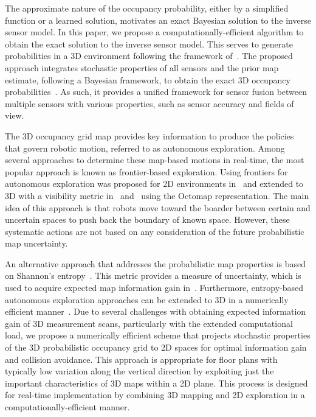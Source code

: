 \documentclass[smallextended]{svjour3}       %
\begin{document}
The approximate nature of the occupancy probability, either by a simplified function or a learned solution, motivates an exact Bayesian solution to the inverse sensor model. In this paper, we propose a computationally-efficient algorithm to obtain the exact solution to the inverse sensor model. This serves to generate probabilities in a 3D environment following the framework of~\cite{KauLeeAiMos16,KauTakAiLee17}. The proposed approach integrates stochastic properties of all sensors and the prior map estimate, following a Bayesian framework, to obtain the exact 3D occupancy probabilities~\cite{KauTakAiLee18}. As such, it provides a unified framework for sensor fusion between multiple sensors with various properties, such as sensor accuracy and fields of view. 


The 3D occupancy grid map provides key information to produce the policies that govern robotic motion, referred to as autonomous exploration. Among several approaches to determine these map-based motions in real-time, the most popular approach is known as frontier-based exploration. Using frontiers for autonomous exploration was proposed for 2D environments in~\cite{Yam97,Yam98} and extended to 3D with a visibility metric in~\cite{SawKriSri09} and~\cite{ZhuDinLinWu15,SenWan16,KleDor13} using the Octomap representation. The main idea of this approach is that robots move toward the boarder between certain and uncertain spaces to push back the boundary of known space. However, these systematic actions are not based on any consideration of the future probabilistic map uncertainty.

An alternative approach that addresses the probabilistic map properties is based on Shannon's entropy~\cite{StaGriBur05}. This metric provides a measure of uncertainty, which is used to acquire expected map information gain in~\cite{KauAiLee16,KauTakAiLee17}. Furthermore, entropy-based autonomous exploration approaches can be extended to 3D in a numerically efficient manner~\cite{KauTakAiLee18}. Due to several challenges with obtaining expected information gain of 3D measurement scans, particularly with the extended computational load, we propose a numerically efficient scheme that projects stochastic properties of the 3D probabilistic occupancy grid to 2D spaces for optimal information gain and collision avoidance. This approach is appropriate for floor plans with typically low variation along the vertical direction by exploiting just the important characteristics of 3D maps within a 2D plane. This process is designed for real-time implementation by combining 3D mapping and 2D exploration in a computationally-efficient manner.
\end{document}
